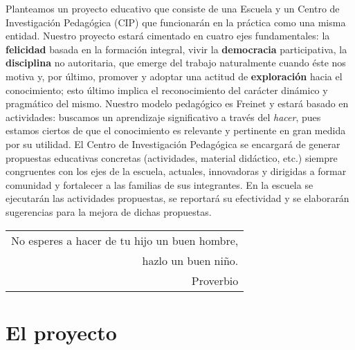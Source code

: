 \documentclass[10pt,letterpaper,oneside]{book}
\makeatletter
\newenvironment{myepigraph}
  {\par\hfill\itshape
   \begin{tabular}{@{}r@{\hspace{2em}}}} %
  {\end{tabular}\par\medskip}
\makeatother
\begin{document}
Planteamos un proyecto educativo que consiste de una Escuela y un Centro de Investigación Pedagógica (CIP) que funcionarán en la práctica como una misma entidad. Nuestro proyecto estará cimentado en cuatro ejes fundamentales: la {\bf felicidad} basada en la formación integral, vivir la {\bf democracia} participativa, la {\bf disciplina} no autoritaria, que emerge del trabajo naturalmente cuando éste nos motiva y, por último, promover y adoptar una actitud de {\bf exploración} hacia el conocimiento; esto último implica el reconocimiento del carácter dinámico y pragmático del mismo. Nuestro modelo pedagógico es Freinet y estará basado en actividades: buscamos un aprendizaje significativo a través del \emph{hacer}, pues estamos ciertos de que el conocimiento es relevante y pertinente en gran medida por su utilidad. El Centro de Investigación Pedagógica se encargará de generar propuestas educativas concretas (actividades, material didáctico, etc.) siempre congruentes con los ejes de la escuela, actuales, innovadoras y dirigidas a formar comunidad y fortalecer a las familias de sus integrantes. En la escuela se ejecutarán las actividades propuestas, se reportará su efectividad y se elaborarán sugerencias para la mejora de dichas propuestas.
\vspace{1cm}
\begin{myepigraph}No esperes a hacer de tu hijo un buen hombre,\\
hazlo un buen niño.
\vspace{0.1cm}\\
Proverbio
\end{myepigraph}

\section{El proyecto}
\end{document}

